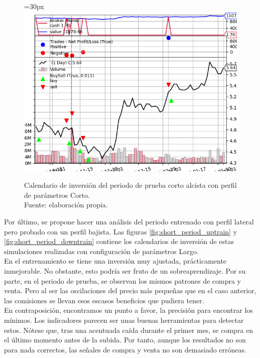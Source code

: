      	\begin{figure}[H]
     		\centering\leftskip=30px
     		\includegraphics[scale=0.70]{imagenes/S_Short_test.png}
     		\caption[Calendario de inversi\'on del periodo de prueba corto alcista]{Calendario de inversi\'on del periodo de prueba corto alcista con perfil de par\'ametros Corto.\\ Fuente: elaboraci\'on propia.}
     		\label{fig:short_period_uptest}
     	\end{figure} 
     	
Por \'ultimo, se propone hacer una an\'alisis del periodo entrenado con perfil lateral pero probado con un perfil bajista. Las figuras \ref{fig:short_period_uptrain} y \ref{fig:short_period_downtrain} contiene los calendarios de inversi\'on de estas simulaciones realizadas con configuraci\'on de par\'ametros Largo.\\

En el entrenamiento se tiene una inversi\'on muy ajustada, pr\'acticamente inmejorable. No obstante, esto podr\'ia ser fruto de un sobreaprendizaje. Por su parte, en el periodo de prueba, se observan los mismos patrones de compra y venta. Pero al ser las oscilaciones del precio m\'as peque\~nas que en el caso anterior, las comisiones se llevan esos escasos beneficios que pudiera tener.\\

En contraposici\'on, encontramos un punto a favor, la precisi\'on para encontrar los m\'inimos. Los indicadores parecen ser unas buenas herramientas para detectar estos. N\'otese que, tras una acentuada ca\'ida durante el primer mes, se compra en el \'ultimo momento antes de la subida. Por tanto, aunque los resultados no son para nada correctos, las se\~nales de compra y venta no son demasiado err\'oneas. \\
     	
